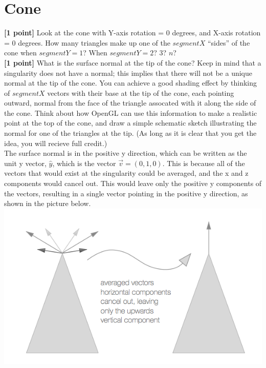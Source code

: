\documentclass[10pt,twocolumn]{article}
\begin{document}
\section{Cone}
{\bf [1 point]} Look at the cone with Y-axis rotation = 0 degrees, and X-axis rotation = 0 degrees. How many triangles make up one of the $segmentX$ ``sides'' of the cone when $segmentY=1$? When $segmentY=2$? 3? $n$?
\vspace{6em}\\
{\bf [1 point]} What is the surface normal at the tip of the cone? Keep in mind that a singularity does not have a normal; this implies that there will not be a unique normal at the tip of the cone. You can achieve a good shading effect by thinking of $segmentX$ vectors with their base at the tip of the cone, each pointing outward, normal from the face of the triangle assocated with it along the side of the cone. Think about how OpenGL can use this information to make a realistic point at the top of the cone, and draw a simple schematic sketch illustrating the normal for one of the triangles at the tip. (As long as it is clear that you get the idea, you will recieve full credit.)
\vspace{2em}\\
The surface normal is in the positive y direction, which can be written as the unit y vector, $\hat{y}$, which is the vector $\vec{v} = (0,1,0)$. This is because all of the vectors that would exist at the singularity could be averaged, and the x and z components would cancel out. This would leave only the positive y components of the vectors, resulting in a single vector pointing in the positive y direction, as shown in the picture below.
\includegraphics[scale=0.4]{graphicshw1cone} \\
\vspace{2em}
\end{document}
